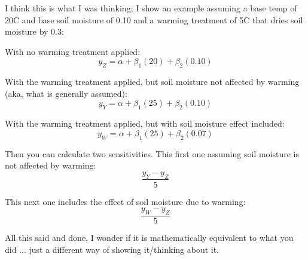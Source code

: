 \documentclass[12pt,a4paper]{article}
\begin{document}
\noindent I think this is what I was thinking; I show an example assuming a base temp of 20C and base soil moisture of 0.10 and a warming treatment of 5C that dries soil moisture by 0.3:

With no warming treatment applied:
\begin{equation}
y_{Z}=\alpha + \beta_1(20)+\beta_2(0.10)
\end{equation}

With the warming treatment applied, but soil moisture not affected by warming (aka, what is generally assumed):
\begin{equation}
y_{Y}=\alpha + \beta_1(25)+\beta_2(0.10)
\end{equation}

With the warming treatment applied, but with soil moisture effect included:
\begin{equation}
y_{W}=\alpha + \beta_1(25)+\beta_2(0.07)
\end{equation}

Then you can calculate two sensitivities. This first one assuming soil moisture is not affected by warming:
\begin{equation}
\frac{y_{Y}-y_{Z}}{5}
\end{equation}

This next one includes the effect of soil moisture due to warming:
\begin{equation}
\frac{y_{W}-y_{Z}}{5}
\end{equation}

All this said and done, I wonder if it is mathematically equivalent to what you did ... just a different way of showing it/thinking about it. 
\end{document}
